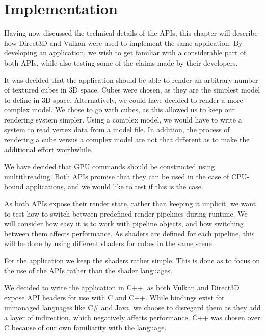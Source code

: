 \chapter{Implementation}\label{ch:implementation}
Having now discussed the technical details of the \glspl{API}, this chapter will describe how Direct3D and Vulkan were used to implement the same application. 
By developing an application, we wish to get familiar with a considerable part of both \glspl{API}, while also testing some of the claims made by their developers.


It was decided that the application should be able to render an arbitrary number of textured cubes in 3D space.
Cubes were chosen, as they are the simplest model to define in 3D space. 
Alternatively, we could have decided to render a more complex model.
We chose to go with cubes, as this allowed us to keep our rendering system simpler. 
Using a complex model, we would have to write a system to read vertex data from a model file. 
In addition, the process of rendering a cube versus a complex model are not that different as to make the additional effort worthwhile. 


We have decided that \gls{GPU} commands should be constructed using multithreading.
Both \glspl{API} promise that they can be used in the case of \gls{CPU}-bound applications, and we would like to test if this is the case. 

As both \glspl{API} expose their render state, rather than keeping it implicit, we want to test how to switch between predefined render pipelines during runtime. 
We will consider how easy it is to work with pipeline objects, and how switching between them affects performance.
As shaders are defined for each pipeline, this will be done by using different shaders for cubes in the same scene.

 
For the application we keep the shaders rather simple.
This is done as to focus on the use of the \glspl{API} rather than the shader languages.


We decided to write the application in C++, as both Vulkan and Direct3D expose \gls{API} headers for use with C and C++.
While bindings exist for unmanaged languages like C\# and Java, we choose to disregard them as they add a layer of indirection, which negatively affects performance.
C++ was chosen over C because of our own familiarity with the language. 

